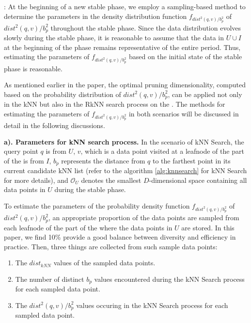 : At the beginning of a new stable phase, we employ a sampling-based method to determine the parameters in the density distribution function $f_{dist^2(q,v)/b_{p}^2}$ of $dist^2(q,v)/b_{p}^2$ throughout the stable phase. Since the data distribution evolves slowly during the stable phase, it is reasonable to assume that the data in $U\cup I$ at the beginning of the phase remains representative of the entire period. Thus, estimating the parameters of $f_{dist^2(q,v)/b^2_{p}}$ based on the initial state of the stable phase is reasonable.

As mentioned earlier in the paper, the optimal pruning dimensionality, computed based on the probability distribution of $dist^2(q,v)/b_{p}^2$, can be applied not only in the kNN but also in the RkNN search process on the \dualtree. The methods for estimating the parameters of $f_{dist^2(q,v)/b_{p}^2}$ in both scenarios will be discussed in detail in the following discussions.

\noindent\textbf{ a). Parameters for kNN search process.}
In the scenario of kNN Search, the query point $q$ is from $U$, $v$, which is a data point visited at a leafnode of the \deltatree part of the \dualtree is from $I$, $b_p$ represents the distance from $q$ to the farthest point in its current candidate kNN list (refer to the algorithm \ref{alg:knnsearch} for kNN Search for more details), and $\mathcal{O}_U$ denotes the smallest $D$-dimensional space containing all data points in $U$ during the stable phase. 

To estimate the parameters of the probability density function $f_{dist^2(q,v)/b^2_p}$ of $dist^2(q,v)/b^2_p$, an appropriate proportion of the data points are sampled from each leafnode of the \hdrtree part of the \dualtree where the data points in $U$ are stored. In this paper, we find 10\% provide a good balance between diversity and efficiency in practice. Then, three things are collected from such sample data points:
\begin{enumerate}
    \item The $dist_{kNN}$ values of the sampled data points.
    \item The number of distinct $b_p$ values encountered during the kNN Search process for each sampled data point.
    \item The $dist^2(q,v)/b_{p}^2$ values occuring in the kNN Search process for each sampled data point.  
\end{enumerate}

